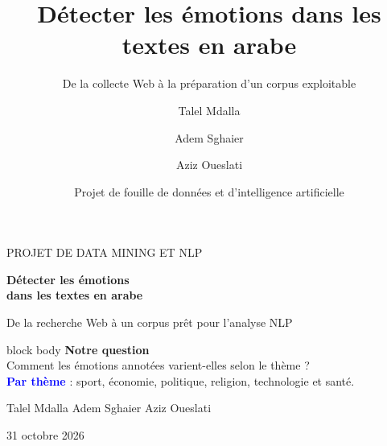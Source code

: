 \documentclass[aspectratio=169,10pt]{beamer}
\title{Détecter les émotions dans les textes en arabe}
\subtitle{De la collecte Web à la préparation d'un corpus exploitable}
\author{Talel Mdalla \and Adem Sghaier \and Aziz Oueslati}
\date{Projet de fouille de données et d'intelligence artificielle}
\begin{document}
\begin{frame}[plain]
\vspace{.6cm}
{\color{Gold}\small PROJET DE DATA MINING ET NLP}\par\vspace{.4cm}
{\color{white}\LARGE\bfseries Détecter les émotions\\dans les textes en arabe}\par\vspace{.4cm}
{\color{white!85}\large De la recherche Web à un corpus prêt pour l'analyse NLP}\par
\vspace{.9cm}
\begin{beamercolorbox}[wd=.86\linewidth,sep=.18cm,rounded=true]{block body}
\textbf{Notre question}\\[-1pt]
Comment les émotions annotées varient-elles selon le thème ?\\
\textcolor{Blue}{\textbf{Par thème}} : sport, économie, politique, religion, technologie et santé.
\end{beamercolorbox}
\vfill
{\color{white!90}\normalsize Talel Mdalla \qquad Adem Sghaier \qquad Aziz Oueslati}\par
{\color{white!70}\small 31 octobre 2026}\vspace{.45cm}
\end{frame}
\end{document}
